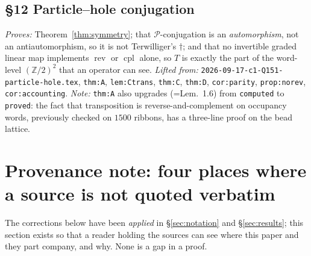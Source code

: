 \documentclass[11pt]{article}
\theoremstyle{definition}
\theoremstyle{remark}
\newcommand{\Z}{\mathbb{Z}}
\newcommand{\PH}{\mathcal{P}}            %
\newcommand{\rev}{\operatorname{rev}}
\newcommand{\cpl}{\operatorname{cpl}}
\begin{document}
\subsection*{\S12 Particle--hole conjugation}
\emph{Proves:} Theorem~\ref{thm:symmetry}; that $\PH$-conjugation is an \emph{automorphism},
not an antiautomorphism, so it is not Terwilliger's $\dagger$; and that no invertible graded
linear map implements $\rev$ or $\cpl$ alone, so $T$ is exactly the part of the word-level
$(\Z/2)^2$ that an operator can see.
\emph{Lifted from:} \texttt{2026-09-17-c1-Q151-particle-hole.tex}, \texttt{thm:A},
\texttt{lem:Ctrans}, \texttt{thm:C}, \texttt{thm:D}, \texttt{cor:parity},
\texttt{prop:norev}, \texttt{cor:accounting}.
\emph{Note:} \texttt{thm:A} also upgrades \cite[\texttt{lem:transpose}]{Q149} (=Lem.~1.6) from
\texttt{computed} to \texttt{proved}: the fact that transposition is reverse-and-complement on
occupancy words, previously checked on $1500$ ribbons, has a three-line proof on the bead
lattice.

\section{Provenance note: four places where a source is not quoted verbatim}\label{sec:provenance}

The corrections below have been \emph{applied} in \S\ref{sec:notation} and
\S\ref{sec:results}; this section exists so that a reader holding the sources can see where
this paper and they part company, and why.  None is a gap in a proof.
\end{document}

